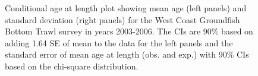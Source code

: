 \documentclass[
]{scrartcl}
\begin{document}
\begin{figure}[H]


\caption{\label{fig-call-plot-wcgbts1}Conditional age at length plot
showing mean age (left panels) and standard deviation (right panels) for
the West Coast Groundfish Bottom Trawl survey in years 2003-2006. The
CIs are 90\% based on adding 1.64 SE of mean to the data for the left
panels and the standard error of mean age at length (obs. and exp.) with
90\% CIs based on the chi-square distribution.}

\end{figure}%
\end{document}
